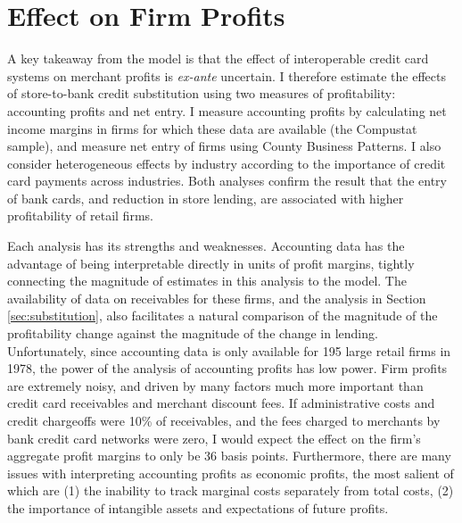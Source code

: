 \documentclass[12pt,english]{article}
\begin{document}

\section{Effect on Firm Profits}\label{sec:profits}

A key takeaway from the model is that the effect of interoperable credit card systems on merchant profits is \emph{ex-ante} uncertain. I therefore estimate the effects of store-to-bank credit substitution using two measures of profitability: accounting profits and net entry. I measure accounting profits by calculating net income margins in firms for which these data are available (the Compustat sample), and measure net entry of firms using County Business Patterns. I also consider heterogeneous effects by industry according to the importance of credit card payments across industries. Both analyses confirm the result that the entry of bank cards, and reduction in store lending, are associated with higher profitability of retail firms. 

Each analysis has its strengths and weaknesses. Accounting data has the advantage of being interpretable directly in units of profit margins, tightly connecting the magnitude of estimates in this analysis to the model. The availability of data on receivables for these firms, and the analysis in Section \ref{sec:substitution}, also facilitates a natural comparison of the magnitude of the profitability change against the magnitude of the change in lending. Unfortunately, since accounting data is only available for 195 large retail firms in 1978, the power of the analysis of accounting profits has low power. Firm profits are extremely noisy, and driven by many factors much more important than credit card receivables and merchant discount fees. If administrative costs and credit chargeoffs were 10\% of receivables, and the fees charged to merchants by bank credit card networks were zero, I would expect the effect on the firm's aggregate profit margins to only be 36 basis points. Furthermore, there are many issues with interpreting accounting profits as economic profits, the most salient of which are (1) the inability to track marginal costs separately from total costs, (2) the importance of intangible assets and expectations of future profits. 
\end{document}
